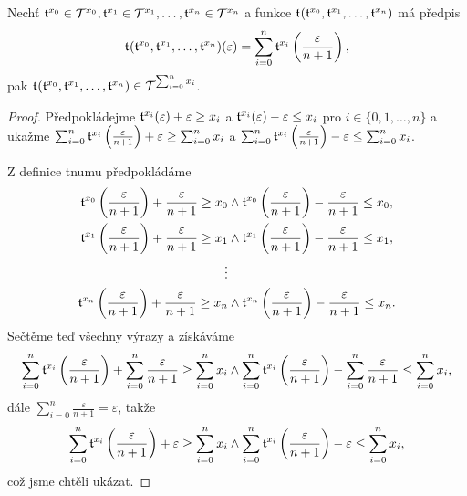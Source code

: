 \begin{theorem}
Nechť $\mathfrak{t}^{x_0}\in\mathcal{T}^{x_0}, \mathfrak{t}^{x_1}\in\mathcal{T}^{x_1}, \ldots, \mathfrak{t}^{x_n}\in\mathcal{T}^{x_n}$ a funkce $\mathfrak{t}^{}(\mathfrak{t}^{x_0},\mathfrak{t}^{x_1},\ldots,\mathfrak{t}^{x_n})$ má předpis
\begin{equation}
\mathfrak{t}^{}(\mathfrak{t}^{x_0},\mathfrak{t}^{x_1},\ldots,\mathfrak{t}^{x_n})(\varepsilon)=\sum_{i=0}^n\mathfrak{t}^{x_i}\left(\frac{\varepsilon}{n+1}\right),
\end{equation}
pak $\mathfrak{t}^{}(\mathfrak{t}^{x_0},\mathfrak{t}^{x_1},\ldots,\mathfrak{t}^{x_n})\in\mathcal{T}^{\sum_{i=0}^nx_i}$.

\begin{proof}
Předpokládejme $\mathfrak{t}^{x_i}(\varepsilon) + \varepsilon \geq x_i$ a $\mathfrak{t}^{x_i}(\varepsilon) - \varepsilon \leq x_i$ pro $i \in \{0, 1, \ldots , n\}$ a ukažme $\sum_{i=0}^n\mathfrak{t}^{x_i}\left(\frac{\varepsilon}{n+1}\right) + \varepsilon \geq \sum_{i=0}^nx_i$ a $\sum_{i=0}^n\mathfrak{t}^{x_i}\left(\frac{\varepsilon}{n+1}\right) - \varepsilon \leq \sum_{i=0}^nx_i$.

Z definice tnumu předpokládáme
\begin{equation}
\begin{aligned}
\mathfrak{t}^{x_0}\left(\frac{\varepsilon}{n+1}\right)+\frac{\varepsilon}{n+1}\geq x_0 &\land \mathfrak{t}^{x_0}\left(\frac{\varepsilon}{n+1}\right)-\frac{\varepsilon}{n+1}\leq x_0,\\
\mathfrak{t}^{x_1}\left(\frac{\varepsilon}{n+1}\right)+\frac{\varepsilon}{n+1}\geq x_1 &\land \mathfrak{t}^{x_1}\left(\frac{\varepsilon}{n+1}\right)-\frac{\varepsilon}{n+1}\leq x_1,\\
\vdots \\
\mathfrak{t}^{x_n}\left(\frac{\varepsilon}{n+1}\right)+\frac{\varepsilon}{n+1}\geq x_n &\land \mathfrak{t}^{x_n}\left(\frac{\varepsilon}{n+1}\right)-\frac{\varepsilon}{n+1}\leq x_n.\\
\end{aligned}
\end{equation}
Sečtěme teď všechny výrazy a získáváme
\begin{equation}
\sum_{i=0}^n\mathfrak{t}^{x_i}\left(\frac{\varepsilon}{n+1}\right) + \sum_{i=0}^n\frac{\varepsilon}{n+1} \geq \sum_{i=0}^nx_i \land \sum_{i=0}^n\mathfrak{t}^{x_i}\left(\frac{\varepsilon}{n+1}\right) - \sum_{i=0}^n\frac{\varepsilon}{n+1} \leq \sum_{i=0}^nx_i,
\end{equation}
dále $\sum_{i=0}^n\frac{\varepsilon}{n+1} = \varepsilon$, takže
\begin{equation}
\sum_{i=0}^n\mathfrak{t}^{x_i}\left(\frac{\varepsilon}{n+1}\right) + \varepsilon \geq \sum_{i=0}^nx_i \land \sum_{i=0}^n\mathfrak{t}^{x_i}\left(\frac{\varepsilon}{n+1}\right) - \varepsilon \leq \sum_{i=0}^nx_i,
\end{equation}
což jsme chtěli ukázat.
\end{proof}
\end{theorem}


